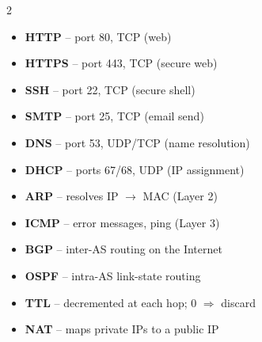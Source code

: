 \documentclass[11pt, letterpaper]{article}
\begin{document}
\begin{tcolorbox}[colback=part3bg, colframe=sectionpurple,
  title={\bfseries Must-Know Protocols \& Ports}, arc=3pt, boxrule=1pt]
\footnotesize
\begin{multicols}{2}
\begin{itemize}[noitemsep, leftmargin=*]
  \item \textbf{HTTP} -- port 80, TCP (web)
  \item \textbf{HTTPS} -- port 443, TCP (secure web)
  \item \textbf{SSH} -- port 22, TCP (secure shell)
  \item \textbf{SMTP} -- port 25, TCP (email send)
  \item \textbf{DNS} -- port 53, UDP/TCP (name resolution)
  \item \textbf{DHCP} -- ports 67/68, UDP (IP assignment)
\end{itemize}
\columnbreak
\begin{itemize}[noitemsep, leftmargin=*]
  \item \textbf{ARP} -- resolves IP $\to$ MAC (Layer 2)
  \item \textbf{ICMP} -- error messages, ping (Layer 3)
  \item \textbf{BGP} -- inter-AS routing on the Internet
  \item \textbf{OSPF} -- intra-AS link-state routing
  \item \textbf{TTL} -- decremented at each hop; 0 $\Rightarrow$ discard
  \item \textbf{NAT} -- maps private IPs to a public IP
\end{itemize}
\end{multicols}
\end{tcolorbox}




\vspace{4pt}
\end{document}
